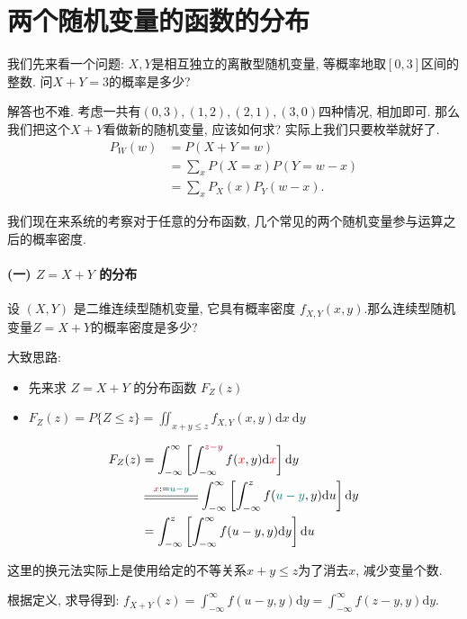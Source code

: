 \section{两个随机变量的函数的分布}

我们先来看一个问题: $X,Y$是相互独立的离散型随机变量, 等概率地取$[0,3]$区间的整数. 问$X+Y=3$的概率是多少? 

解答也不难. 考虑一共有$(0, 3), (1, 2), (2, 1), (3, 0)$四种情况, 相加即可. 那么我们把这个$X+Y$看做新的随机变量, 应该如何求? 实际上我们只要枚举就好了.
$$
\begin{aligned}
P_W(w) & =P(X+Y=w) \\
& =\sum_x P(X=x)  P(Y=w-x) \\
& =\sum_x P_X(x) P_Y(w-x) . 
\end{aligned}
$$

我们现在来系统的考察对于任意的分布函数, 几个常见的两个随机变量参与运算之后的概率密度. 

\paragraph{(一) $Z=X+Y$ 的分布}

设 $(X, Y)$ 是二维连续型随机变量, 它具有概率密度 $f_{X,Y}(x, y)$.那么连续型随机变量$Z=X+Y$的概率密度是多少?

大致思路: 
    \begin{itemize}
        \item 先来求 $Z=X+Y$ 的分布函数 $F_Z(z)$
        \item $F_Z(z)=P\{Z \leqslant z\}=\iint_{x+y \leqslant z} f_{X,Y}(x, y) \mathrm{d} x \mathrm{~d} y$
    \end{itemize}
    $$\begin{aligned}
        F_Z(z)&=\int_{-\infty}^{\infty}\left[\int_{-\infty}^{\purple {z-y}} f({\red{x}}, y) \mathrm{d} {\red{x}}\right] \mathrm{d} y \\ 
        &\stackrel{{\red x}:=\teal{u-y}}{\stackrel{\rule{1.5cm}{0.4pt}}{\rule{1.5cm}{0.4pt}}}
        \int_{-\infty}^{\infty}\left[\int_{-\infty}^z f({\teal {u-y}}, y) \mathrm{d} u\right] \mathrm{d} y\\
        &=\int_{-\infty}^z\left[\int_{-\infty}^{\infty} f(u-y, y) \mathrm{d} y\right] \mathrm{d} u
    \end{aligned}$$

    这里的换元法实际上是使用给定的不等关系$x+y\leq z$为了消去$x$, 减少变量个数. 

    根据定义, 求导得到: 
    $f_{X+Y}(z)=\int_{-\infty}^{\infty} f(u-y, y) \mathrm{d} y=\int_{-\infty}^{\infty} f(z-y, y) \mathrm{d} y.$

